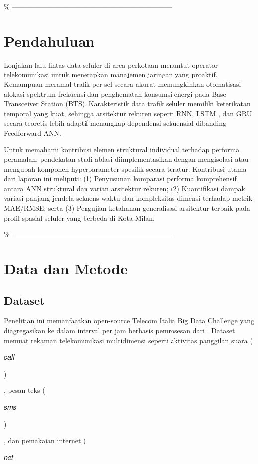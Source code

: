 \documentclass[conference,a4paper]{IEEEtran}
\begin{document}
\% --------------------------------------------------------------------- \section{Pendahuluan}
Lonjakan lalu lintas data seluler di area perkotaan menuntut operator telekomunikasi untuk menerapkan manajemen jaringan yang proaktif. Kemampuan meramal trafik per sel secara akurat memungkinkan otomatisasi alokasi spektrum frekuensi dan penghematan konsumsi energi pada Base Transceiver Station (BTS). Karakteristik data trafik seluler memiliki keterikatan temporal yang kuat, sehingga arsitektur rekuren seperti RNN, LSTM \cite{hochreiter1997lstm}, dan GRU \cite{cho2014gru} secara teoretis lebih adaptif menangkap dependensi sekuensial dibanding Feedforward ANN. 

Untuk memahami kontribusi elemen struktural individual terhadap performa peramalan, pendekatan studi ablasi diimplementasikan dengan mengisolasi atau mengubah komponen hyperparameter spesifik secara teratur. Kontribusi utama dari laporan ini meliputi: (1) Penyusunan komparasi performa komprehensif antara ANN struktural dan varian arsitektur rekuren; (2) Kuantifikasi dampak variasi panjang jendela sekuens waktu dan kompleksitas dimensi terhadap metrik MAE/RMSE; serta (3) Pengujian ketahanan generalisasi arsitektur terbaik pada profil spasial seluler yang berbeda di Kota Milan. 

\% --------------------------------------------------------------------- \section{Data dan Metode} 

\subsection{Dataset} Penelitian ini memanfaatkan open-source Telecom Italia Big Data Challenge \cite{barlacchi2015milan} yang diagregasikan ke dalam interval per jam berbasis pemrosesan dari \cite{zhang2021fedda}. Dataset memuat rekaman telekomunikasi multidimensi seperti aktivitas panggilan suara 
(

𝑐𝑎𝑙𝑙

)

,
 pesan teks 
(

𝑠𝑚𝑠

)

,
 dan pemakaian internet 
(

𝑛𝑒𝑡
\end{document}
